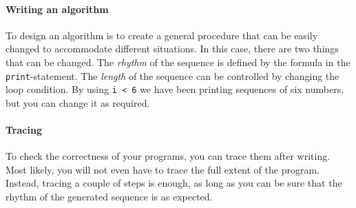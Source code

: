 \paragraph{Writing an algorithm}

To design an algorithm is to create a general procedure that can be easily changed to accommodate different situations. In this case, there are two things that can be changed. The \emph{rhythm} of the sequence is defined by the formula in the \texttt{print}-statement. The \emph{length} of the sequence can be controlled by changing the loop condition. By using  \texttt{i < 6} we have been printing sequences of six numbers, but you can change it as required.

\paragraph{Tracing}

To check the correctness of your programs, you can trace them after writing. Most likely, you will not even have to trace the full extent of the program. Instead, tracing a couple of steps is enough, as long as you can be sure that the rhythm of the generated sequence is as expected.


